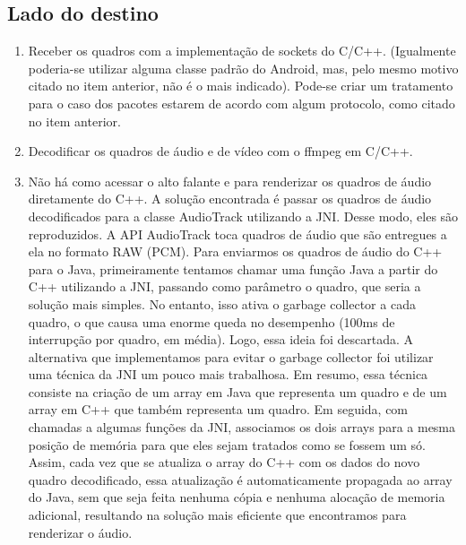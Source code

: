 \documentclass{acm_proc_article-sp}
\begin{document}
\subsection{Lado do destino}
\begin{enumerate}
 \item Receber os quadros com a implementação de sockets do C/C++. (Igualmente poderia-se utilizar alguma classe padrão do Android, mas, pelo mesmo motivo citado no item anterior, não é o mais indicado). Pode-se criar um tratamento para o caso dos pacotes estarem de acordo com algum protocolo, como citado no item anterior.
 \item Decodificar os quadros de áudio e de vídeo com o ffmpeg em C/C++.
 \item Não há como acessar o alto falante e para renderizar os quadros de áudio diretamente do C++. A solução encontrada é passar os quadros de áudio decodificados para a classe AudioTrack utilizando a JNI. Desse modo, eles são reproduzidos. A API AudioTrack toca quadros de áudio que são entregues a ela no formato RAW (PCM). Para enviarmos os quadros de áudio do C++ para o Java, primeiramente tentamos chamar uma função Java a partir do C++ utilizando a JNI, passando como parâmetro o quadro, que seria a solução mais simples. No entanto, isso ativa o garbage collector a cada quadro, o que causa uma enorme queda no desempenho (100ms de interrupção por quadro, em média). Logo, essa ideia foi descartada. A alternativa que implementamos para evitar o garbage collector foi utilizar uma técnica da JNI um pouco mais trabalhosa. Em resumo, essa técnica consiste na criação de um array em Java que representa um quadro e de um array em C++ que também representa um quadro. Em seguida, com chamadas a algumas funções da JNI, associamos os dois arrays para a mesma posição de memória para que eles sejam tratados como se fossem um só. Assim, cada vez que se atualiza o array do C++ com os dados do novo quadro decodificado, essa atualização é automaticamente propagada ao array do Java, sem que seja feita nenhuma cópia e nenhuma alocação de memoria adicional, resultando na solução mais eficiente que encontramos para renderizar o áudio.

\end{enumerate}
\end{document}
